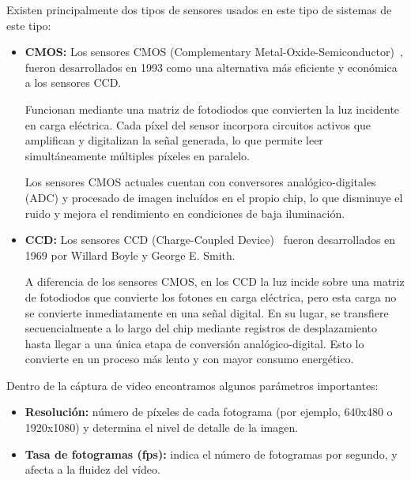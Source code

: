 Existen principalmente dos tipos de sensores usados en este tipo de sistemas de este tipo:
\begin{itemize}
    \item \textbf{CMOS:} Los sensores CMOS (Complementary Metal-Oxide-Semiconductor)~\citep{cmos}, fueron desarrollados en 1993 como una alternativa más eficiente y económica a los sensores CCD.

    Funcionan mediante una matriz de fotodiodos que convierten la luz incidente en carga eléctrica.
    Cada píxel del sensor incorpora circuitos activos que amplifican y digitalizan la señal generada, lo que permite leer simultáneamente múltiples píxeles en paralelo.

    Los sensores CMOS actuales cuentan con conversores analógico-digitales (ADC) y procesado de imagen incluídos en el propio chip, lo que disminuye el ruido y mejora el rendimiento en condiciones de baja iluminación.
    \item \textbf{CCD:} Los sensores CCD (Charge-Coupled Device)~\citep{blanc2001ccd} fueron desarrollados en 1969 por Willard Boyle y George E. Smith.

    A diferencia de los sensores CMOS, en los CCD la luz incide sobre una matriz de fotodiodos que convierte los fotones en carga eléctrica, pero esta carga no se convierte inmediatamente en una señal digital.
    En su lugar, se transfiere secuencialmente a lo largo del chip mediante registros de desplazamiento hasta llegar a una única etapa de conversión analógico-digital.
%
    Esto lo convierte en un proceso más lento y con mayor consumo energético.
\end{itemize}
Dentro de la cáptura de video encontramos algunos parámetros importantes:
\begin{itemize}
    \item \textbf{Resolución:} número de píxeles de cada fotograma (por ejemplo, 640x480 o 1920x1080) y determina el nivel de detalle de la imagen.
    \item \textbf{Tasa de fotogramas (fps):} indica el número de fotogramas por segundo, y afecta a la fluidez del vídeo.
\end{itemize}

